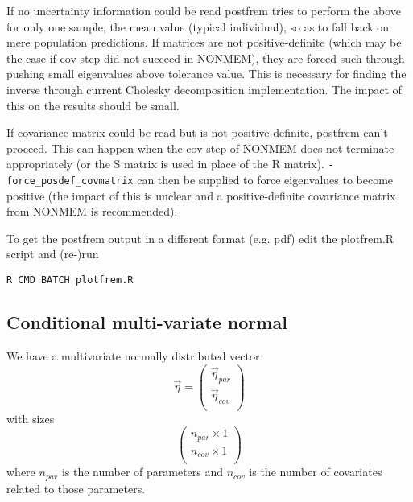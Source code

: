 \noindent If no uncertainty information could be read postfrem tries to perform the above for only one sample, the mean
value (typical individual), so as to fall back on mere population predictions. If matrices are not positive-definite
(which may be the case if cov step did not succeed in NONMEM), they are forced such through pushing small eigenvalues
above tolerance value. This is necessary for finding the inverse through current Cholesky decomposition implementation.
The impact of this on the results should be small.

If covariance matrix could be read but is not positive-definite, postfrem can't proceed. This can happen when the cov
step of NONMEM does not terminate appropriately (or the S matrix is used in place of the R matrix).
\texttt{-force\_posdef\_covmatrix} can then be supplied to force eigenvalues to become positive (the impact of this is
unclear and a positive-definite covariance matrix from NONMEM is recommended).

To get the postfrem output in a different format (e.g. pdf) edit the plotfrem.R script and (re-)run
\begin{verbatim}
R CMD BATCH plotfrem.R
\end{verbatim}



\subsection*{Conditional multi-variate normal}

We have a multivariate normally distributed vector
\[
\vec{\eta} = \left(
\begin{array}{c}
\vec{\eta}_{par} \\
\vec{\eta}_{cov}\\
\end{array}
\right)
\]
with sizes
\[
\left(
\begin{array}{c}
n_{par} \times 1 \\
n_{cov} \times 1\\
\end{array}
\right)
\]
where $n_{par}$ is the number of parameters and $n_{cov}$ is the number of covariates related to those parameters.

